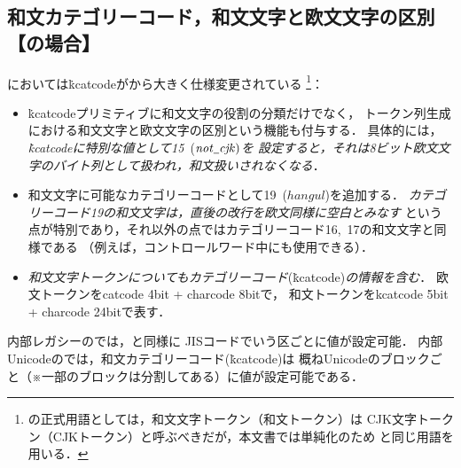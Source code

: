 \documentclass[a4paper,11pt,nomag,dvipdfmx]{jsarticle}
\def\_{\leavevmode\vrule width .45em height -.2ex depth .3ex\relax}
\begin{document}
\subsection{和文カテゴリーコード，和文文字と欧文文字の区別【\upTeX の場合】}
\label{sec:uptex_kcat}
\upTeX においては\.{kcatcode}が\pTeX から大きく仕様変更されている
\footnote{\upTeX の正式用語としては，和文文字トークン（和文トークン）は
CJK文字トークン（CJKトークン）と呼ぶべきだが，本文書では単純化のため
\pTeX と同じ用語を用いる．}：
\begin{itemize}
  \item \.{kcatcode}プリミティブに和文文字の役割の分類だけでなく，
    トークン列生成における和文文字と欧文文字の区別という機能も付与する．
    具体的には，\emph{\.{kcatcode}に特別な値として15~}($\mathit{not\_cjk})$\emph{を
    設定すると，それは8ビット欧文文字のバイト列として扱われ，和文扱いされなくなる}．
  \item 和文文字に可能なカテゴリーコードとして19~($\mathit{hangul}$)を追加する．
    \emph{カテゴリーコード19の和文文字は，直後の改行を欧文同様に空白とみなす}
    という点が特別であり，それ以外の点ではカテゴリーコード16,~17の和文文字と同様である
    （例えば，コントロールワード中にも使用できる）．
  \item \emph{和文文字トークンについてもカテゴリーコード}(\.{kcatcode})\emph{の情報を含む}．
    欧文トークンをcatcode 4bit + charcode 8bitで，
    和文トークンをkcatcode 5bit + charcode 24bitで表す．
\end{itemize}

\begin{cslist}
  \csitem[\.{kcatcode} <character code>=<15--19>]
  内部レガシーの\upTeX では，\pTeX と同様に
  JISコードでいう区ごとに値が設定可能．
  内部Unicodeの\upTeX では，和文カテゴリーコード(\.{kcatcode})は
  概ねUnicodeのブロックごと（※一部のブロックは分割してある）に値が設定可能である．
\end{cslist}
\end{document}
